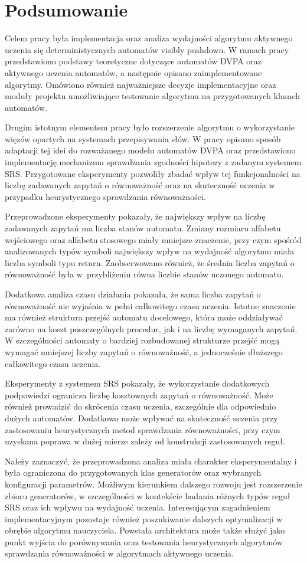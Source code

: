 \chapter{Podsumowanie}

Celem pracy była implementacja oraz analiza wydajności algorytmu aktywnego
uczenia się deterministycznych automatów visibly pushdown. W ramach pracy
przedstawiono podstawy teoretyczne dotyczące automatów DVPA oraz aktywnego
uczenia automatów, a następnie opisano zaimplementowane algorytmy.
Omówiono również najważniejsze decyzje implementacyjne oraz moduły
projektu umożliwiające testowanie algorytmu na przygotowanych klasach automatów.

Drugim istotnym elementem pracy było rozszerzenie algorytmu o wykorzystanie
więzów opartych na systemach przepisywania słów. W pracy opisano sposób
adaptacji tej idei do rozważanego modelu automatów DVPA oraz przedstawiono
implementację mechanizmu sprawdzania zgodności hipotezy z zadanym systemem
SRS. Przygotowane eksperymenty pozwoliły zbadać wpływ tej funkcjonalności na
liczbę zadawanych zapytań o równoważność oraz na skuteczność uczenia w przypadku
heurystycznego sprawdzania równoważności.

Przeprowadzone eksperymenty pokazały, że największy wpływ na liczbę zadawanych
zapytań ma liczba stanów automatu. Zmiany rozmiaru alfabetu wejściowego oraz
alfabetu stosowego miały mniejsze znaczenie, przy czym spośród analizowanych
typów symboli największy wpływ na wydajność algorytmu miała liczba symboli typu
return. Zaobserwowano również, że średnia liczba zapytań o równoważność była w~przybliżeniu
równa liczbie stanów uczonego automatu.

Dodatkowa analiza czasu działania pokazała, że sama liczba zapytań o równoważność
nie wyjaśnia w pełni całkowitego czasu uczenia. Istotne znaczenie ma również struktura
przejść automatu docelowego, która może oddziaływać zarówno na koszt poszczególnych
procedur, jak i na liczbę wymaganych zapytań.
W szczególności automaty o bardziej rozbudowanej strukturze przejść mogą wymagać
mniejszej liczby zapytań o równoważność, a jednocześnie dłuższego całkowitego czasu uczenia.

Eksperymenty z systemem SRS pokazały, że wykorzystanie dodatkowych podpowiedzi
ogranicza liczbę kosztownych zapytań o równoważność. Może również prowadzić do
skrócenia czasu uczenia, szczególnie dla odpowiednio dużych automatów. Dodatkowo może
wpływać na skuteczność uczenia przy zastosowaniu heurystycznych metod
sprawdzania równoważności, przy czym uzyskana poprawa w dużej mierze zależy
od konstrukcji zastosowanych reguł.

Należy zaznaczyć, że przeprowadzona analiza miała charakter eksperymentalny i
była ograniczona do przygotowanych klas generatorów oraz wybranych konfiguracji
parametrów. Możliwym kierunkiem dalszego rozwoju jest rozszerzenie zbioru
generatorów, w szczególności w kontekście badania różnych typów reguł SRS oraz
ich wpływu na wydajność uczenia. Interesującym zagadnieniem implementacyjnym
pozostaje również poszukiwanie dalszych optymalizacji w obrębie algorytmu
nauczyciela. Powstała architektura może także służyć jako punkt wyjścia do
porównywania oraz testowania heurystycznych algorytmów sprawdzania
równoważności w algorytmach aktywnego uczenia.
